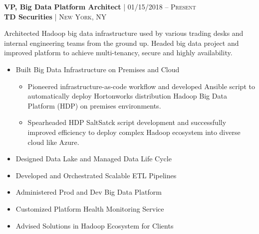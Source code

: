 {\raggedright\normalsize
\textbf{VP, Big Data Platform Architect} {\hfill\footnotesize\textsc{| 01/15/2018 -- Present}}\\ 
\textbf{TD Securities} {\hfill\footnotesize\textsc{| New York, NY}}}
\setlength\vspace{1pt}

Architected Hadoop big data infrastructure used by various trading desks and internal engineering teams from the ground up.
Headed big data project and improved platform to achieve multi-tenancy, secure and highly availability. 

\begin{itemize}[leftmargin=*, topsep=2pt, partopsep=2.5pt]
\setlength\itemsep{-0.2em}

\item Built Big Data Infrastructure on Premises and Cloud

\begin{itemize}[leftmargin=*, topsep=-5pt, partopsep=2.5pt]
\setlength\itemsep{-0.2em}
\item Pioneered infrastructure-as-code workflow and developed Ansible script to automatically deploy Hortonworks distribution Hadoop Big Data Platform (HDP) on premises environments.  
\item Spearheaded HDP SaltSatck script development and successfully improved efficiency to deploy complex Hadoop ecosystem into diverse cloud like Azure.
\end{itemize}

\item Designed Data Lake and Managed Data Life Cycle


\item Developed and Orchestrated Scalable ETL Pipelines
\item Administered Prod and Dev Big Data Platform
\item Customized Platform Health Monitoring Service 


\item Advised Solutions in Hadoop Ecosystem for Clients

\end{itemize}

